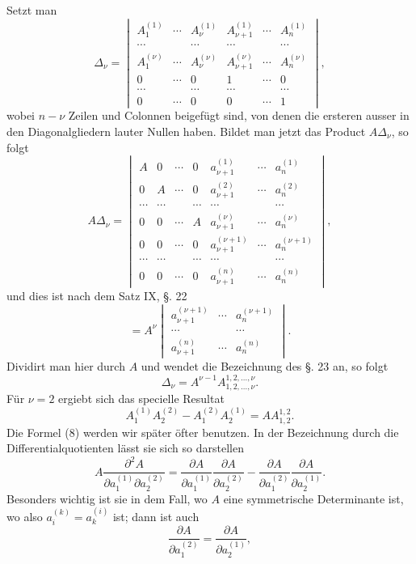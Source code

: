 
Setzt man
\[
\Delta_\nu=\begin{vmatrix}
 A_1^{(1)}&\cdots&A_\nu^{(1)}&A_{\nu+1}^{(1)}&\cdots&A_n^{(1)}\\
 \cdots&&\cdots&\cdots&&\cdots\\
 A_1^{(\nu)}&\cdots&A_\nu^{(\nu)}&A_{\nu+1}^{(\nu)}&\cdots&A_n^{(\nu)}\\
 0&\cdots&0&1&\cdots&0\\
 \cdots&&\cdots&\cdots&&\cdots\\
 0&\cdots&0&0&\cdots&1
\end{vmatrix},\tag{5}
\]
wobei $n-\nu$ Zeilen und Colonnen beigefügt sind, von denen die ersteren ausser in den Diagonalgliedern lauter Nullen haben. Bildet man jetzt das Product $A\Delta_\nu$, so folgt
\begin{equation}
A\Delta_\nu=
\begin{vmatrix}
 A&0&\cdots&0&a_{\nu+1}^{(1)}&\cdots&a_n^{(1)}\\
 0&A&\cdots&0&a_{\nu+1}^{(2)}&\cdots&a_n^{(2)}\\
 \cdots&\cdots&&\cdots&\cdots&&\cdots\\
 0&0&\cdots&A&a_{\nu+1}^{(\nu)}&\cdots&a_n^{(\nu)}\\
 0&0&\cdots&0&a_{\nu+1}^{(\nu+1)}&\cdots&a_n^{(\nu+1)}\\
 \cdots&\cdots&&\cdots&\cdots&&\cdots\\
 0&0&\cdots&0&a_{\nu+1}^{(n)}&\cdots&a_n^{(n)}
\end{vmatrix},\tag{6}
\end{equation}
und dies ist nach dem Satz IX, §. 22
\[
= A^\nu
 \begin{vmatrix}
 a_{\nu+1}^{(\nu+1)}&\cdots&a_n^{(\nu+1)}\\
 \cdots&&\cdots\\
 a_{\nu+1}^{(n)}&\cdots&a_n^{(n)}
 \end{vmatrix}.
\]
Dividirt man hier durch $A$ und wendet die Bezeichnung des §. 23 an, so folgt
\begin{equation}
 \Delta_\nu=A^{\nu-1}A_{1,2,\ldots,\nu}^{1,2,\ldots,\nu}.\tag{7}
\end{equation}
Für $\nu=2$ ergiebt sich das specielle Resultat
\begin{equation}
 A_1^{(1)}A_2^{(2)}-A_1^{(2)}A_2^{(1)}=A A_{1,2}^{1,2}.\tag{8}
\end{equation}
Die Formel (8) werden wir später öfter benutzen. In der Bezeichnung durch die Differentialquotienten lässt sie sich so darstellen
\begin{equation}
 A\frac{\partial^2A}{\partial a_1^{(1)}\partial a_2^{(2)}}
 =\frac{\partial A}{\partial a_1^{(1)}}\frac{\partial A}{\partial a_2^{(2)}}
 -\frac{\partial A}{\partial a_1^{(2)}}\frac{\partial A}{\partial a_2^{(1)}}.\tag{9}
\end{equation}
Besonders wichtig ist sie in dem Fall, wo $A$ eine symmetrische Determinante ist, wo also $a_i^{(k)}=a_k^{(i)}$ ist; dann ist auch
\[
 \frac{\partial A}{\partial a_1^{(2)}}=\frac{\partial A}{\partial a_2^{(1)}},
\]
